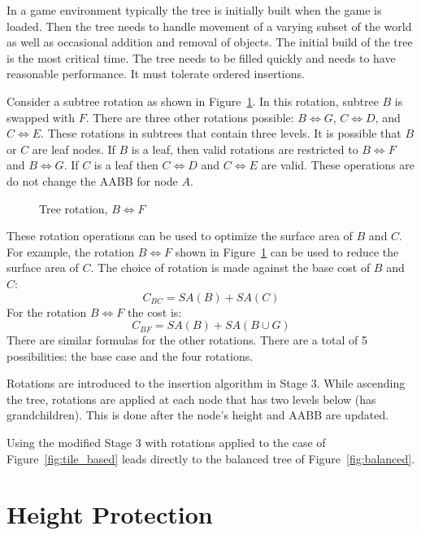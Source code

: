 \documentclass{article}
\begin{document}
In a game environment typically the tree is initially built when the game is loaded. Then the tree needs to handle movement of a varying subset of the world as well as occasional addition and removal of objects. The initial build of the tree is the most critical time. The tree needs to be filled quickly and needs to have reasonable performance. It must tolerate ordered insertions.

Consider a subtree rotation as shown in Figure~\ref{fig:rotate}. In this rotation, subtree $B$ is swapped with $F$. There are three other rotations possible: $B \Leftrightarrow G$, $C \Leftrightarrow D$, and $C \Leftrightarrow E$. These rotations in subtrees that contain three levels. It is possible that $B$ or $C$ are leaf nodes. If $B$ is a leaf, then valid rotations are restricted to $B \Leftrightarrow F$ and $B \Leftrightarrow G$. If $C$ is a leaf then $C \Leftrightarrow D$ and $C \Leftrightarrow E$ are valid. These operations are do not change the AABB for node $A$.

\begin{figure}
	\begin{center}
		
	\end{center}
	\caption{Tree rotation, $B \Leftrightarrow F$ }
	\label{fig:rotate}
\end{figure}

These rotation operations can be used to optimize the surface area of $B$ and $C$. For example, the rotation $B \Leftrightarrow F$ shown in Figure~\ref{fig:rotate} can be used to reduce the surface area of $C$. The choice of rotation is made against the base cost of $B$ and $C$:
\[ C_{BC} = SA(B) + SA(C) \]
For the rotation $B \Leftrightarrow F$ the cost is:
\[ C_{BF} = SA(B) + SA(B \cup G) \]
There are similar formulas for the other rotations. There are a total of 5 possibilities: the base case and the four rotations.

Rotations are introduced to the insertion algorithm in Stage 3. While ascending the tree, rotations are applied at each node that has two levels below (has grandchildren). This is done after the node's height and AABB are updated.

Using the modified Stage 3 with rotations applied to the case of Figure~\ref{fig:tile_based} leads directly to the balanced tree of Figure~\ref{fig:balanced}.

\section{Height Protection}
\end{document}
